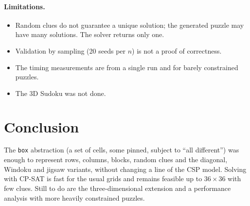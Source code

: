 \documentclass[11pt,a4paper]{article}
\begin{document}
\paragraph{Limitations.}
\begin{itemize}
  \item Random clues do not guarantee a unique solution; the generated puzzle may have many solutions. The solver returns only one.
  \item Validation by sampling (20 seeds per $n$) is not a proof of correctness.
  \item The timing measurements are from a single run and for barely constrained puzzles.
  \item The 3D Sudoku was not done.
\end{itemize}

\section{Conclusion}

The \texttt{box} abstraction (a set of cells, some pinned, subject to ``all different'') was enough to represent rows, columns, blocks, random clues and the diagonal, Windoku and jigsaw variants, without changing a line of the CSP model. Solving with CP-SAT is fast for the usual grids and remains feasible up to $36\times 36$ with few clues. Still to do are the three-dimensional extension and a performance analysis with more heavily constrained puzzles.
\end{document}
